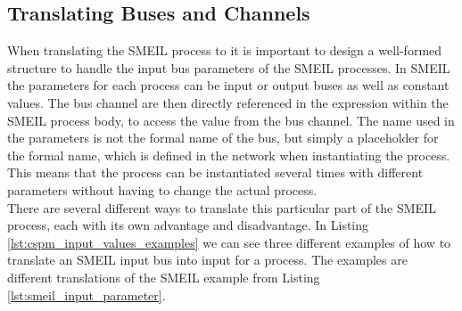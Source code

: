 \subsection{Translating Buses and Channels}



When translating the SMEIL process to \cspm{} it is important to design a well-formed structure to handle the input bus parameters of the SMEIL processes.
In SMEIL the parameters for each process can be input or output buses as well as constant values. The bus channel are then directly referenced in the expression within the SMEIL process body, to access the value from the bus channel. The name used in the parameters is not the formal name of the bus, but simply a placeholder for the formal name, which is defined in the network when instantiating the process. This means that the process can be instantiated several times with different parameters without having to change the actual process. \\

There are several different ways to translate this particular part of the SMEIL process, each with its own advantage and disadvantage.
In Listing \ref{lst:cspm_input_values_examples} we can see three different examples of how to translate an SMEIL input bus into input for a \cspm{} process. The examples are different translations of the SMEIL example from Listing \ref{lst:smeil_input_parameter}.\\

